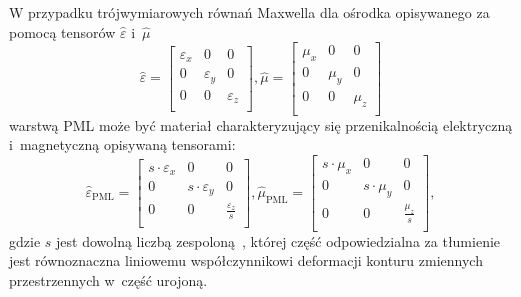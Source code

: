 W przypadku trójwymiarowych równań Maxwella dla ośrodka opisywanego za pomocą tensorów $\hat{\varepsilon}$ i~$\hat{\mu}$ 
\begin{equation}
\hat{\varepsilon}=
\begin{bmatrix}
\varepsilon_x & 0 & 0 \\
0 &\varepsilon_y & 0 \\
0 & 0  & \varepsilon_z  \\
\end{bmatrix}
, \hat{\mu}=
\begin{bmatrix}
\mu_x & 0 & 0 \\
0 &\mu_y & 0 \\
0 & 0  & \mu_z  \\
\end{bmatrix}
\end{equation}
warstwą PML może być materiał charakteryzujący się przenikalnością elektryczną i~magnetyczną opisywaną tensorami:
\begin{equation}
\hat{\varepsilon}_{\textrm{PML}}=
\begin{bmatrix}
s \cdot \varepsilon_x & 0 & 0 \\
0 &s \cdot \varepsilon_y & 0 \\
0 & 0  & \frac{ \varepsilon_z}{s}  \\
\end{bmatrix}
, \hat{\mu}_{\textrm{PML}}=
\begin{bmatrix}
s \cdot \mu_x & 0 & 0 \\
0 & s \cdot \mu_y & 0 \\
0 & 0  & \frac{\mu_z}{s}  \\
\end{bmatrix},
\label{eq:general-pml-form}
\end{equation}
gdzie $s$ jest dowolną liczbą zespoloną~\cite{sacks1995perfectly}, której część odpowiedzialna za tłumienie jest równoznaczna liniowemu współczynnikowi deformacji konturu zmiennych przestrzennych w~część urojoną.



